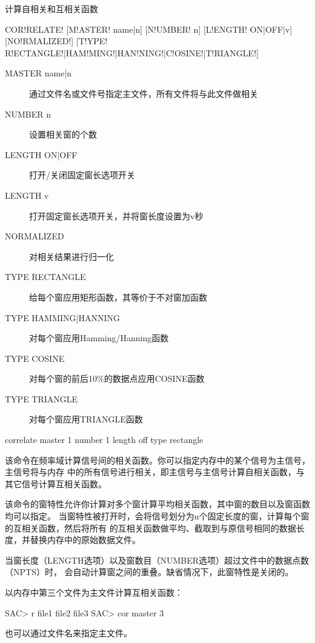 \label{cmd:correlate}

计算自相关和互相关函数

\begin{SACSTX}
    COR!RELATE! [M!ASTER! name|n] [N!UMBER! n] [L!ENGTH! ON|OFF|v] [NO!RMALIZED!]
    [T!YPE! R!ECTANGLE!|HAM!MING!|HAN!NING!|C!OSINE!|T!RIANGLE!]
\end{SACSTX}

\begin{description}
\item [MASTER name|n] 通过文件名或文件号指定主文件，所有文件将与此文件做相关
\item [NUMBER n] 设置相关窗的个数
\item [LENGTH ON|OFF] 打开/关闭固定窗长选项开关
\item [LENGTH v] 打开固定窗长选项开关，并将窗长度设置为v秒
\item [NORMALIZED] 对相关结果进行归一化
\item [TYPE RECTANGLE] 给每个窗应用矩形函数，其等价于不对窗加函数
\item [TYPE HAMMING|HANNING] 对每个窗应用Hamming/Hanning函数
\item [TYPE COSINE] 对每个窗的前后10\%的数据点应用COSINE函数
\item [TYPE TRIANGLE] 对每个窗应用TRIANGLE函数
\end{description}

\begin{SACDFT}
correlate master 1 number 1 length off type rectangle
\end{SACDFT}

该命令在频率域计算信号间的相关函数。你可以指定内存中的某个信号为主信号，主信号将与内存
中的所有信号进行相关，即主信号与主信号计算自相关函数，与其它信号计算互相关函数。

该命令的窗特性允许你计算对多个窗计算平均相关函数，其中窗的数目以及窗函数均可以指定。
当窗特性被打开时，会将信号划分为n个固定长度的窗，计算每个窗的互相关函数，然后将所有
的互相关函数做平均、截取到与原信号相同的数据长度，并替换内存中的原始数据文件。

当窗长度（LENGTH选项）以及窗数目（NUMBER选项）超过文件中的数据点数（NPTS）时，
会自动计算窗之间的重叠。缺省情况下，此窗特性是关闭的。

以内存中第三个文件为主文件计算互相关函数：
\begin{SACCode}
SAC> r file1 file2 file3
SAC> cor master 3
\end{SACCode}
也可以通过文件名来指定主文件。

